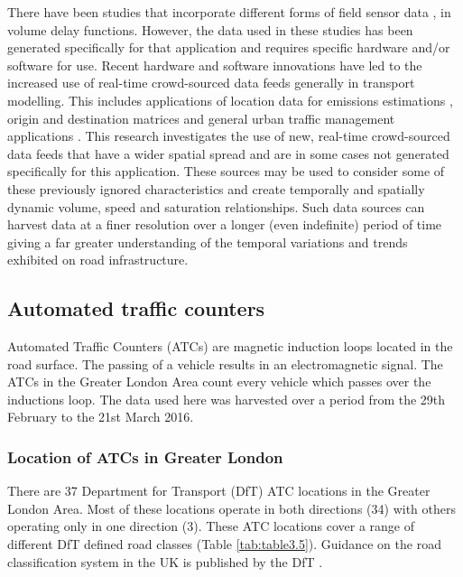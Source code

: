 \documentclass{CUP-JNL-DCE}
\begin{document}
There have been studies that incorporate different forms of field sensor data \citep{mtoi2014calibration}, \citep{neuhold2014volume} in volume delay functions. However, the data used in these studies has been generated specifically for that application and requires specific hardware and/or software for use. Recent hardware and software innovations have led to the increased use of real-time crowd-sourced data feeds generally in transport modelling. This includes applications of location data for emissions estimations \citep{hirschmann2010new}, origin and destination matrices \citep{toole2015path} and general urban traffic management applications \citep{artikis2014heterogeneous}. This research investigates the use of new, real-time crowd-sourced data feeds that have a wider spatial spread and are in some cases not generated specifically for this application. These sources may be used to consider some of these previously ignored characteristics and create temporally and spatially dynamic volume, speed and saturation relationships. Such data sources can harvest data at a finer resolution over a longer (even indefinite) period of time giving a far greater understanding of the temporal variations and trends exhibited on road infrastructure.

\subsection{Automated traffic counters}

Automated Traffic Counters (ATCs) are magnetic induction loops located in the road surface. The passing of a vehicle results in an electromagnetic signal. The ATCs in the Greater London Area count every vehicle which passes over the inductions loop. The data used here was harvested over a period from the 29th February to the 21st March 2016.

\subsubsection{Location of ATCs in Greater London}

There are 37 Department for Transport (DfT) ATC locations in the Greater London Area. Most of these locations operate in both directions (34) with others operating only in one direction (3). These ATC locations cover a range of different DfT defined road classes (Table \ref{tab:table3.5}). Guidance on the road classification system in the UK is published by the DfT \citep{DfT_road_classification}.
\end{document}
